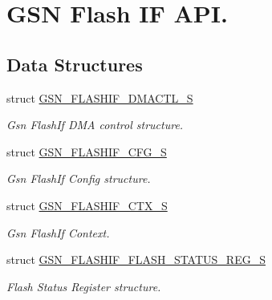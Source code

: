 \hypertarget{a00647}{
\section{GSN Flash IF API.}
\label{a00647}
}
\subsection*{Data Structures}
\begin{DoxyCompactItemize}
\item 
struct \hyperlink{a00080}{GSN\_\-FLASHIF\_\-DMACTL\_\-S}
\begin{DoxyCompactList}\small\item\em Gsn FlashIf DMA control structure. \end{DoxyCompactList}\item 
struct \hyperlink{a00078}{GSN\_\-FLASHIF\_\-CFG\_\-S}
\begin{DoxyCompactList}\small\item\em Gsn FlashIf Config structure. \end{DoxyCompactList}\item 
struct \hyperlink{a00079}{GSN\_\-FLASHIF\_\-CTX\_\-S}
\begin{DoxyCompactList}\small\item\em Gsn FlashIf Context. \end{DoxyCompactList}\item 
struct \hyperlink{a00081}{GSN\_\-FLASHIF\_\-FLASH\_\-STATUS\_\-REG\_\-S}
\begin{DoxyCompactList}\small\item\em Flash Status Register structure. \end{DoxyCompactList}\end{DoxyCompactItemize}
